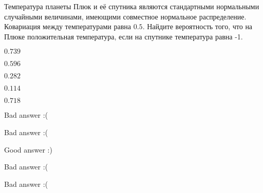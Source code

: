 
\begin{question}
Температура планеты Плюк и её спутника являются стандартными нормальными
случайными величинами, имеющими совместное нормальное распределение.
Ковариация между температурами равна \(0.5\). Найдите вероятность того,
что на Плюке положительная температура, если на спутнике температура
равна -1.
\begin{answerlist}
  \item \(0.739\)
  \item \(0.596\)
  \item \(0.282\)
  \item \(0.114\)
  \item \(0.718\)
\end{answerlist}
\end{question}

\begin{solution}
\begin{answerlist}
  \item Bad answer :(
  \item Bad answer :(
  \item Good answer :)
  \item Bad answer :(
  \item Bad answer :(
\end{answerlist}
\end{solution}

